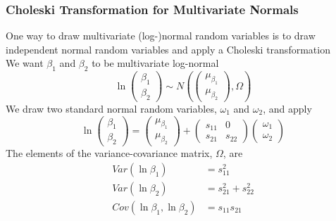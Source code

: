 \documentclass{beamer}\usepackage[]{graphicx}\usepackage[]{color}
\begin{document}
\begin{frame}\frametitle{Choleski Transformation for Multivariate Normals}
    One way to draw multivariate (log-)normal random variables is to draw independent normal random variables and apply a Choleski transformation \\
    \vspace{2ex}
    We want $\beta_1$ and $\beta_2$ to be multivariate log-normal
	$$\ln
		\begin{pmatrix}
    		\beta_1 \\
    		\beta_2
    	\end{pmatrix}
    	\sim N \left(
    	\begin{pmatrix}
    		\mu_{\beta_1} \\
    		\mu_{\beta_2}
    	\end{pmatrix},
      \Omega \right)$$
    We draw two standard normal random variables, $\omega_1$ and $\omega_2$, and apply
    $$\ln
		\begin{pmatrix}
    		\beta_1 \\
    		\beta_2
    	\end{pmatrix}
    	= 
    	\begin{pmatrix}
    		\mu_{\beta_1} \\
    		\mu_{\beta_2}
    	\end{pmatrix}
    	+
    	\begin{pmatrix}
    		s_{11} & 0 \\
    		s_{21} & s_{22}
    	\end{pmatrix}
    	\begin{pmatrix}
    		\omega_1 \\
    		\omega_2
    	\end{pmatrix}$$
    The elements of the variance-covariance matrix, $\Omega$, are
    \begin{align*}
    	Var(\ln \beta_1) &= s_{11}^2 \\
    	Var(\ln \beta_2) &= s_{21}^2 + s_{22}^2 \\
    	Cov(\ln \beta_1, \ln \beta_2) &= s_{11} s_{21}	
    \end{align*}
\end{frame}
\end{document}
